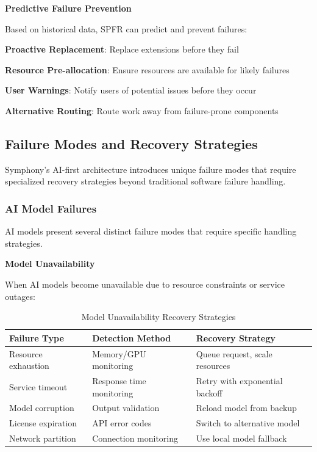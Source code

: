 \textbf{Predictive Failure Prevention}

Based on historical data, SPFR can predict and prevent failures:

\begin{compactlist}
    \item \textbf{Proactive Replacement}: Replace extensions before they fail
    \item \textbf{Resource Pre-allocation}: Ensure resources are available for likely failures
    \item \textbf{User Warnings}: Notify users of potential issues before they occur
    \item \textbf{Alternative Routing}: Route work away from failure-prone components
\end{compactlist}

\subsection{Failure Modes and Recovery Strategies}
\label{subsec:failure-modes-recovery}

Symphony's AI-first architecture introduces unique failure modes that require specialized recovery strategies beyond traditional software failure handling.

\subsubsection{AI Model Failures}

AI models present several distinct failure modes that require specific handling strategies.

\textbf{Model Unavailability}

When AI models become unavailable due to resource constraints or service outages:

\begin{table}[h]
\centering
\caption{Model Unavailability Recovery Strategies}
\label{tab:model-unavailability}
\begin{tabular}{@{}lll@{}}
\toprule
\textbf{Failure Type} & \textbf{Detection Method} & \textbf{Recovery Strategy} \\
\midrule
Resource exhaustion & Memory/GPU monitoring & Queue request, scale resources \\
Service timeout & Response time monitoring & Retry with exponential backoff \\
Model corruption & Output validation & Reload model from backup \\
License expiration & API error codes & Switch to alternative model \\
Network partition & Connection monitoring & Use local model fallback \\
\bottomrule
\end{tabular}
\end{table}

